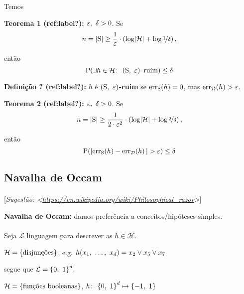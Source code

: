 {Temos

\textbf{Teorema 1 (ref:label?):} $\varepsilon,\ \delta>0$. Se
\[
  n = \l|\mathrm{S}\r| \geq \frac{1}{\eps}\cdot\l(\log\l|\mathcal{H}\r| + \log\nicefrac{1}{\delta}\r),
\]

então
\[
  \mathrm{P}\l(\exists h\in\mathcal{H}\colon\ \l(\mathrm{S},\ \eps\r)\text{-ruim}\r) \leq \delta
\]

\textbf{Definição ? (ref:label?):} $h$ é \textbf{$\l(\mathrm{S},\ \eps\r)$-ruim} se $\mathrm{err}_\mathrm{S}\l(h\r)=0$, mas $\mathrm{err}_\mathcal{D}\l(h\r)>\eps$.

\textbf{Teorema 2 (ref:label?):} $\varepsilon,\ \delta>0$. Se
\[
  n = \l|\mathrm{S}\r| \geq \frac{1}{2\cdot\eps^2}\cdot\l(\log\l|\mathcal{H}\r| + \log\nicefrac{2}{\delta}\r),
\]

então
\[
  \mathrm{P}\l(\l|\mathrm{err}_\mathrm{S}\l(h\r)-\mathrm{err}_\mathcal{D}\l(h\r)\r| > \eps\r) \leq \delta
\]

\clearpage
\subsection{Navalha de Occam}

\paragraph{\nopunct}[\textit{Sugestão: <\href{https://en.wikipedia.org/wiki/Philosophical\_razor}{https://en.wikipedia.org/wiki/Philosophical\_razor}>}]

\begin{afirmacao}
  \label{afr:navalha_de_occam}
  \normalfont
  \textbf{Navalha de Occam:} damos preferência a conceitos/hipóteses simples.
\end{afirmacao}

\paragraph{\nopunct} Seja $\mathcal{L}$ linguagem para descrever as $h\in\mathcal{H}$.

\begin{exemplo}
  $\mathcal{H}=\l\{\text{disjunções}\r\}$, e.g. $h\l(x_1,\ \ldots,\ x_d\r)=x_2\lor x_5\lor x_7$
  
  segue que $\mathcal{L}=\l\{0,\ 1\r\}^d$.
\end{exemplo}

\begin{exemplo}
  $\mathcal{H}=\l\{\text{funções booleanas}\r\}$, $h\colon\ \l\{0,\ 1\r\}^d\mapsto\l\{-1,\ 1\r\}$
  

\end{exemplo}}
